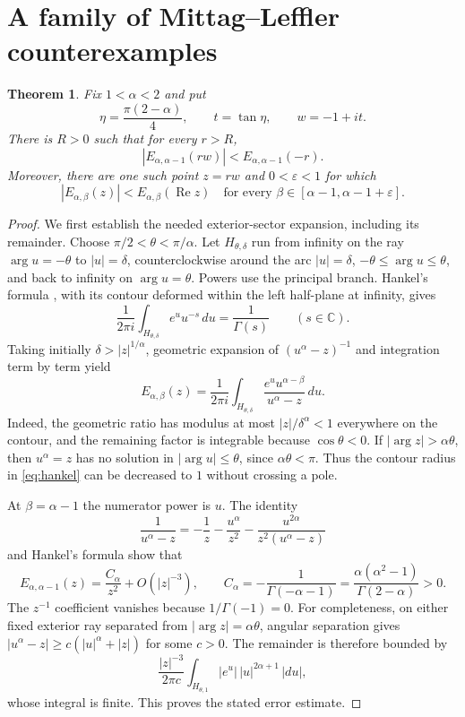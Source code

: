 \documentclass[11pt]{article}
\newtheorem{theorem}{Theorem}
\newcommand{\Rea}{\operatorname{Re}}
\begin{document}
\section{A family of Mittag--Leffler counterexamples}
\begin{theorem}\label{thm:family}
Fix $1<\alpha<2$ and put
\[
 \eta=\frac{\pi(2-\alpha)}4,\qquad
 t=\tan\eta,\qquad w=-1+it.
\]
There is $R>0$ such that for every $r>R$,
\[
 |E_{\alpha,\alpha-1}(rw)|<E_{\alpha,\alpha-1}(-r).
\]
Moreover, there are one such point $z=rw$ and $0<\varepsilon<1$
for which
\begin{equation}\label{eq:interval}
 |E_{\alpha,\beta}(z)|<E_{\alpha,\beta}(\Rea z)
 \quad\text{for every }\beta\in[\alpha-1,\alpha-1+\varepsilon].
\end{equation}
\end{theorem}
\begin{proof}
We first establish the needed exterior-sector expansion, including
its remainder. Choose $\pi/2<\theta<\pi/\alpha$.
Let $H_{\theta,\delta}$ run from infinity on the ray
$\arg u=-\theta$ to $|u|=\delta$, counterclockwise around
the arc $|u|=\delta$, $-\theta\le\arg u\le\theta$, and back
to infinity on $\arg u=\theta$. Powers use the principal branch.
Hankel's formula \cite[Eq.~5.9.2]{hankel}, with its contour deformed
within the left half-plane at infinity, gives
\[
 \frac1{2\pi i}\int_{H_{\theta,\delta}}e^u u^{-s}\,du
 =\frac1{\Gamma(s)}\qquad(s\in\mathbb C).
\]
Taking initially $\delta>|z|^{1/\alpha}$, geometric expansion of
$(u^\alpha-z)^{-1}$ and integration term by term yield
\begin{equation}\label{eq:hankel}
 E_{\alpha,\beta}(z)=\frac1{2\pi i}
 \int_{H_{\theta,\delta}}
 \frac{e^u u^{\alpha-\beta}}{u^\alpha-z}\,du.
\end{equation}
Indeed, the geometric ratio has modulus at most
$|z|/\delta^\alpha<1$ everywhere on the contour, and the remaining
factor is integrable because $\cos\theta<0$.
If $|\arg z|>\alpha\theta$, then $u^\alpha=z$ has no solution
in $|\arg u|\le\theta$, since $\alpha\theta<\pi$.
Thus the contour radius in \eqref{eq:hankel} can be decreased to $1$
without crossing a pole.

At $\beta=\alpha-1$ the numerator power is $u$. The identity
\[
 \frac1{u^\alpha-z}=-\frac1z-\frac{u^\alpha}{z^2}
 -\frac{u^{2\alpha}}{z^2(u^\alpha-z)}
\]
and Hankel's formula show that
\begin{equation}\label{eq:asymptotic}
 E_{\alpha,\alpha-1}(z)=\frac{C_\alpha}{z^2}
 +O(|z|^{-3}),\qquad
 C_\alpha=-\frac1{\Gamma(-\alpha-1)}
 =\frac{\alpha(\alpha^2-1)}{\Gamma(2-\alpha)}>0.
\end{equation}
The $z^{-1}$ coefficient vanishes because $1/\Gamma(-1)=0$.
For completeness, on either fixed exterior ray separated from
$|\arg z|=\alpha\theta$, angular separation gives
$|u^\alpha-z|\ge c(|u|^\alpha+|z|)$ for some $c>0$.
The remainder is therefore bounded by
\[
 \frac{|z|^{-3}}{2\pi c}
 \int_{H_{\theta,1}}|e^u|\,|u|^{2\alpha+1}\,|du|,
\]
whose integral is finite. This proves the stated error estimate.


\end{proof}
\end{document}
